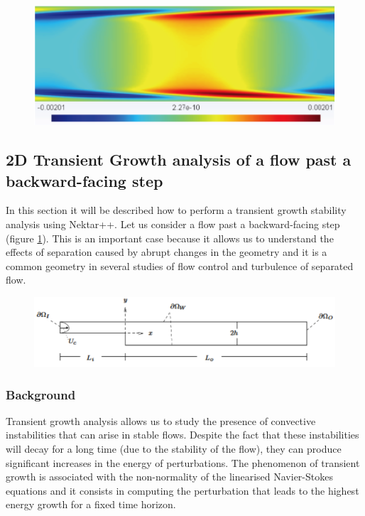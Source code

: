 \begin{figure}[!htbp]
\centering
 {\includegraphics[width=1 \textwidth]{img/chan_v_adj}}
    \caption {}
\end{figure}

\subsection{2D Transient Growth analysis of a flow past a backward-facing step}

In this section it will be described how to perform a transient growth stability analysis using Nektar++. Let us consider a flow past a backward-facing step (figure \ref{bfs_geo}). This is an important case because it allows us to understand  the effects of separation caused by abrupt changes in the geometry and it is a common geometry in several studies of flow control and turbulence of separated flow.

\begin{figure}[!htbp]
\centering
 {\includegraphics[width=1 \textwidth]{img/bfs_geo}}
    \caption {}\label{bfs_geo}
\end{figure}

\subsubsection{Background}

Transient growth analysis allows us to study the presence of convective instabilities that can arise in stable flows. Despite the fact that these instabilities will decay for a long time (due to the stability of the flow), they can produce significant increases in the energy of perturbations. The phenomenon of transient growth is associated with the non-normality of the linearised Navier-Stokes equations and it consists in computing the perturbation that leads to the highest energy growth for a fixed time horizon.

